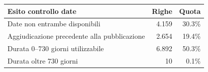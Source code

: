 \begin{tabular}{lrr}
\toprule
Esito controllo date & Righe & Quota \\
\midrule
Date non entrambe disponibili & 4.159 & 30.3\% \\
Aggiudicazione precedente alla pubblicazione & 2.654 & 19.4\% \\
Durata 0--730 giorni utilizzabile & 6.892 & 50.3\% \\
Durata oltre 730 giorni & 10 & 0.1\% \\
\bottomrule
\end{tabular}
